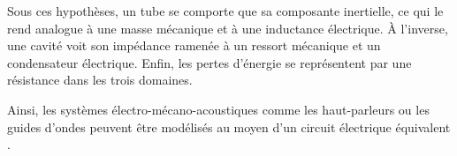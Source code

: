 Sous ces hypothèses, un tube se comporte que sa composante inertielle, ce qui le rend analogue à une masse mécanique et à une inductance électrique. À l'inverse, une cavité voit son impédance ramenée à un ressort mécanique et un condensateur électrique. Enfin, les pertes d'énergie se représentent par une résistance dans les trois domaines.

Ainsi, les systèmes électro-mécano-acoustiques comme les haut-parleurs ou les guides d'ondes peuvent être modélisés au moyen d'un circuit électrique équivalent \cite{Electroac_Grains}. 
%
%    

